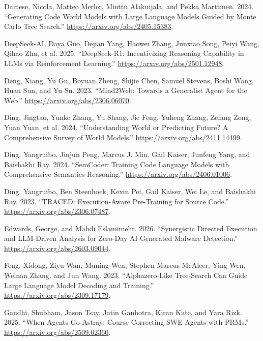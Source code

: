 \documentclass{article}
\newlength{\cslhangindent}
\newenvironment{CSLReferences}[2]
 {%
  \setlength{\parindent}{0pt}
  \everypar{\setlength{\hangindent}{\cslhangindent}}\ignorespaces
 }
 {\par}
\begin{document}
\begin{CSLReferences}{1}{0}
\leavevmode{}%
Dainese, Nicola, Matteo Merler, Minttu Alakuijala, and Pekka Marttinen.
2024. {``Generating Code World Models with Large Language Models Guided
by Monte Carlo Tree Search.''} \url{https://arxiv.org/abs/2405.15383}.

\leavevmode{}%
DeepSeek-AI, Daya Guo, Dejian Yang, Haowei Zhang, Junxiao Song, Peiyi
Wang, Qihao Zhu, et al. 2025. {``DeepSeek-R1: Incentivizing Reasoning
Capability in LLMs via Reinforcement Learning.''}
\url{https://arxiv.org/abs/2501.12948}.

\leavevmode{}%
Deng, Xiang, Yu Gu, Boyuan Zheng, Shijie Chen, Samuel Stevens, Boshi
Wang, Huan Sun, and Yu Su. 2023. {``Mind2Web: Towards a Generalist Agent
for the Web.''} \url{https://arxiv.org/abs/2306.06070}.

\leavevmode{}%
Ding, Jingtao, Yunke Zhang, Yu Shang, Jie Feng, Yuheng Zhang, Zefang
Zong, Yuan Yuan, et al. 2024. {``Understanding World or Predicting
Future? A Comprehensive Survey of World Models.''}
\url{https://arxiv.org/abs/2411.14499}.

\leavevmode{}%
Ding, Yangruibo, Jinjun Peng, Marcus J. Min, Gail Kaiser, Junfeng Yang,
and Baishakhi Ray. 2024. {``SemCoder: Training Code Language Models with
Comprehensive Semantics Reasoning.''}
\url{https://arxiv.org/abs/2406.01006}.

\leavevmode{}%
Ding, Yangruibo, Ben Steenhoek, Kexin Pei, Gail Kaiser, Wei Le, and
Baishakhi Ray. 2023. {``TRACED: Execution-Aware Pre-Training for Source
Code.''} \url{https://arxiv.org/abs/2306.07487}.

\leavevmode{}%
Edwards, George, and Mahdi Eslamimehr. 2026. {``Synergistic Directed
Execution and LLM-Driven Analysis for Zero-Day AI-Generated Malware
Detection.''} \url{https://arxiv.org/abs/2603.09044}.

\leavevmode{}%
Feng, Xidong, Ziyu Wan, Muning Wen, Stephen Marcus McAleer, Ying Wen,
Weinan Zhang, and Jun Wang. 2023. {``Alphazero-Like Tree-Search Can
Guide Large Language Model Decoding and Training.''}
\url{https://arxiv.org/abs/2309.17179}.

\leavevmode{}%
Gandhi, Shubham, Jason Tsay, Jatin Ganhotra, Kiran Kate, and Yara Rizk.
2025. {``When Agents Go Astray: Course-Correcting SWE Agents with
PRMs.''} \url{https://arxiv.org/abs/2509.02360}.


\end{CSLReferences}
\end{document}
